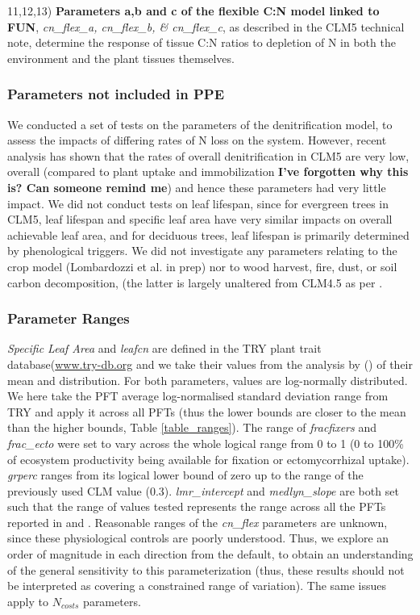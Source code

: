 \documentclass[draft,linenumbers]{agujournal}
\begin{document}
11,12,13) \textbf{Parameters a,b and c of the flexible C:N model linked to FUN}, \emph{cn\_flex\_a, cn\_flex\_b, \& cn\_flex\_c}, as described in the CLM5 technical note, determine the response of tissue C:N ratios to depletion of N in both the environment and the plant tissues themselves.


\subsubsection{Parameters not included in PPE}

We conducted a set of tests on the parameters of the denitrification model, to assess the impacts of differing rates of N loss on the system. However, recent analysis has shown that the rates of overall denitrification in CLM5 are very low, overall (compared to plant uptake and immobilization \textbf{I've forgotten why this is? Can someone remind me}) and hence these parameters had very little impact. We did not conduct tests on leaf lifespan, since for evergreen trees in CLM5, leaf lifespan and specific leaf area have very similar impacts on overall achievable leaf area, and for deciduous trees, leaf lifespan is primarily determined by phenological triggers. We did not investigate any parameters relating to the crop model (Lombardozzi et al. in prep) nor to wood harvest, fire, dust, or soil carbon decomposition, (the latter is largely unaltered from CLM4.5 as per \cite{koven2013}.

\subsubsection{Parameter Ranges}

\emph{Specific Leaf Area} and \emph{leafcn} are defined in the TRY plant trait database(\url{www.try-db.org} and we take their values from the analysis by (\cite{kattge2011}) of their mean and distribution. For both parameters, values are log-normally distributed. We here take the PFT average log-normalised standard deviation range from TRY and apply it across all PFTs (thus the lower bounds are closer to the mean than the higher bounds, Table \ref{table_ranges}). The range of \emph{fracfixers} and \emph{frac\_ecto} were set to vary across the whole logical range from 0 to 1 (0 to 100\% of ecosystem productivity being available for fixation or ectomycorrhizal uptake). \emph{grperc} ranges from its logical lower bound of zero up to the range of the previously used CLM value (0.3). \emph{lmr\_intercept} and \emph{medlyn\_slope} are both set such that the range of values tested represents the range across all the PFTs reported in \cite{atkin2015} and \cite{dekauwe2015}. Reasonable ranges of the \emph{cn\_flex} parameters are unknown, since these physiological controls are poorly understood. Thus, we explore an order of magnitude in each direction from the default, to obtain an understanding of the general sensitivity to this parameterization (thus, these results should not be interpreted as covering a constrained range of variation). The same issues apply to $N_{costs}$ parameters.
\end{document}
